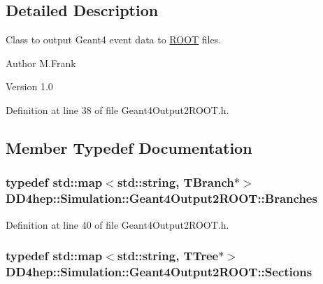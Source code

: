 \subsection{Detailed Description}
Class to output Geant4 event data to \hyperlink{namespace_r_o_o_t}{ROOT} files. \begin{DoxyAuthor}{Author}
M.Frank 
\end{DoxyAuthor}
\begin{DoxyVersion}{Version}
1.0 
\end{DoxyVersion}


Definition at line 38 of file Geant4Output2ROOT.h.

\subsection{Member Typedef Documentation}
\hypertarget{class_d_d4hep_1_1_simulation_1_1_geant4_output2_r_o_o_t_a7c5890a17d3f70ce65703cdbec3cf53c}{
\subsubsection[{Branches}]{\setlength{\rightskip}{0pt plus 5cm}typedef std::map$<$std::string, TBranch$\ast$$>$ {\bf DD4hep::Simulation::Geant4Output2ROOT::Branches}}}
\label{class_d_d4hep_1_1_simulation_1_1_geant4_output2_r_o_o_t_a7c5890a17d3f70ce65703cdbec3cf53c}


Definition at line 40 of file Geant4Output2ROOT.h.\hypertarget{class_d_d4hep_1_1_simulation_1_1_geant4_output2_r_o_o_t_a6bee4e4ece80aae4e2e07295486f8cd0}{
\subsubsection[{Sections}]{\setlength{\rightskip}{0pt plus 5cm}typedef std::map$<$std::string, TTree$\ast$$>$ {\bf DD4hep::Simulation::Geant4Output2ROOT::Sections}}}
\label{class_d_d4hep_1_1_simulation_1_1_geant4_output2_r_o_o_t_a6bee4e4ece80aae4e2e07295486f8cd0}


